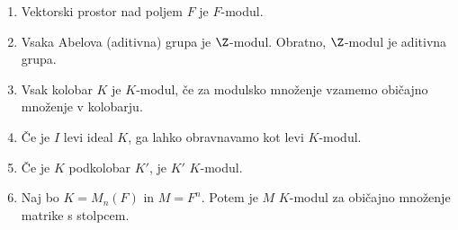 \begin{primer}
    \begin{enumerate}
        \item Vektorski prostor nad poljem $F$ je $F$-modul.
        \item Vsaka Abelova (aditivna) grupa je $\Z$-modul. Obratno, $\Z$-modul je 
        aditivna grupa.
        \item Vsak kolobar $K$ je $K$-modul, če za modulsko množenje vzamemo običajno 
        množenje v kolobarju.
        \item Če je $I$ levi ideal $K$, ga lahko obravnavamo kot levi $K$-modul.
        \item Če je $K$ podkolobar $K'$, je $K'$ $K$-modul.
        \item Naj bo $K = M_n(F)$ in $M = F^n$. Potem je $M$ $K$-modul za običajno 
        množenje matrike s stolpcem.
    \end{enumerate}
\end{primer}
